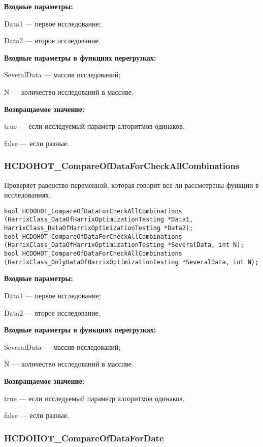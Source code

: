 \documentclass[a4paper,12pt]{article}
\begin{document}
\textbf{Входные параметры:}

Data1 --- первое исследование;
 
Data2 --- второе исследование.
	 
\textbf{Входные параметры в функциях перегрузках:}

SeveralData --- массив исследований;
 
N --- количество исследований в массиве.

\textbf{Возвращаемое значение:}

true --- если исследуемый параметр алгоритмов одинаков.
 
false --- если разные.


\subsubsection{HCDOHOT\_CompareOfDataForCheckAllCombinations}\label{HCDOHOT_CompareOfDataForCheckAllCombinations}

Проверяет равенство переменной, которая говорит все ли рассмотрены функции в исследованиях.


\begin{lstlisting}[label=code_syntax_HCDOHOT_CompareOfDataForCheckAllCombinations,caption=Синтаксис]
bool HCDOHOT_CompareOfDataForCheckAllCombinations (HarrixClass_DataOfHarrixOptimizationTesting *Data1, HarrixClass_DataOfHarrixOptimizationTesting *Data2);
bool HCDOHOT_CompareOfDataForCheckAllCombinations (HarrixClass_DataOfHarrixOptimizationTesting *SeveralData, int N);
bool HCDOHOT_CompareOfDataForCheckAllCombinations (HarrixClass_OnlyDataOfHarrixOptimizationTesting *SeveralData, int N);
\end{lstlisting}

\textbf{Входные параметры:}

Data1 --- первое исследование;
 
Data2 --- второе исследование.
	 
\textbf{Входные параметры в функциях перегрузках:}

SeveralData --- массив исследований;
 
N --- количество исследований в массиве.

\textbf{Возвращаемое значение:}

true --- если исследуемый параметр алгоритмов одинаков.
 
false --- если разные.


\subsubsection{HCDOHOT\_CompareOfDataForDate}\label{HCDOHOT_CompareOfDataForDate}
\end{document}
